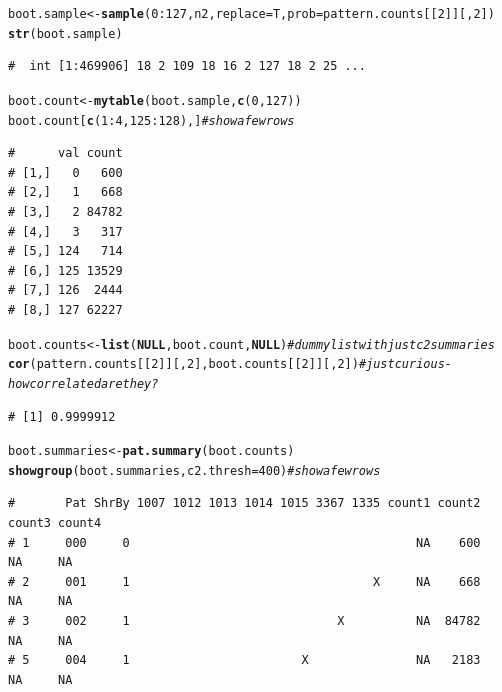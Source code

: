 \documentclass{article}\usepackage[]{graphicx}\usepackage[]{color}
\makeatletter
\newcommand{\hlnum}[1]{\textcolor[rgb]{0.686,0.059,0.569}{#1}}%
\newcommand{\hlcom}[1]{\textcolor[rgb]{0.678,0.584,0.686}{\textit{#1}}}%
\newcommand{\hlopt}[1]{\textcolor[rgb]{0,0,0}{#1}}%
\newcommand{\hlstd}[1]{\textcolor[rgb]{0.345,0.345,0.345}{#1}}%
\newcommand{\hlkwa}[1]{\textcolor[rgb]{0.161,0.373,0.58}{\textbf{#1}}}%
\newcommand{\hlkwb}[1]{\textcolor[rgb]{0.69,0.353,0.396}{#1}}%
\newcommand{\hlkwc}[1]{\textcolor[rgb]{0.333,0.667,0.333}{#1}}%
\newcommand{\hlkwd}[1]{\textcolor[rgb]{0.737,0.353,0.396}{\textbf{#1}}}%
\newenvironment{kframe}{%
 \def\at@end@of@kframe{}%
 \ifinner\ifhmode%
  \def\at@end@of@kframe{\end{minipage}}%
  \begin{minipage}{\columnwidth}%
 \fi\fi%
 \def\FrameCommand##1{\hskip\@totalleftmargin \hskip-\fboxsep
 \colorbox{shadecolor}{##1}\hskip-\fboxsep
     \hskip-\linewidth \hskip-\@totalleftmargin \hskip\columnwidth}%
 \MakeFramed {\advance\hsize-\width
   \@totalleftmargin\z@ \linewidth\hsize
   \@setminipage}}%
 {\par\unskip\endMakeFramed%
 \at@end@of@kframe}
\newenvironment{knitrout}{}{} %
\makeatother
\begin{document}
\begin{knitrout}\footnotesize
{}\color{fgcolor}\begin{kframe}
\begin{alltt}
\hlstd{boot.sample} \hlkwb{<-} \hlkwd{sample}\hlstd{(}\hlnum{0}\hlopt{:}\hlnum{127}\hlstd{,n2,}\hlkwc{replace}\hlstd{=T,}\hlkwc{prob}\hlstd{=pattern.counts[[}\hlnum{2}\hlstd{]][,}\hlnum{2}\hlstd{])}
\hlkwd{str}\hlstd{(boot.sample)}
\end{alltt}
\begin{verbatim}
#  int [1:469906] 18 2 109 18 16 2 127 18 2 25 ...
\end{verbatim}
\begin{alltt}
\hlstd{boot.count} \hlkwb{<-} \hlkwd{mytable}\hlstd{(boot.sample,}\hlkwd{c}\hlstd{(}\hlnum{0}\hlstd{,}\hlnum{127}\hlstd{))}
\hlstd{boot.count[}\hlkwd{c}\hlstd{(}\hlnum{1}\hlopt{:}\hlnum{4}\hlstd{,}\hlnum{125}\hlopt{:}\hlnum{128}\hlstd{),]} \hlcom{# show a few rows}
\end{alltt}
\begin{verbatim}
#      val count
# [1,]   0   600
# [2,]   1   668
# [3,]   2 84782
# [4,]   3   317
# [5,] 124   714
# [6,] 125 13529
# [7,] 126  2444
# [8,] 127 62227
\end{verbatim}
\begin{alltt}
\hlstd{boot.counts} \hlkwb{<-} \hlkwd{list}\hlstd{(}\hlkwa{NULL}\hlstd{,boot.count,}\hlkwa{NULL}\hlstd{)} \hlcom{# dummy list with just c2 summaries}
\hlkwd{cor}\hlstd{(pattern.counts[[}\hlnum{2}\hlstd{]][,}\hlnum{2}\hlstd{],boot.counts[[}\hlnum{2}\hlstd{]][,}\hlnum{2}\hlstd{])} \hlcom{# just curious - how correlated are they?}
\end{alltt}
\begin{verbatim}
# [1] 0.9999912
\end{verbatim}
\begin{alltt}
\hlstd{boot.summaries} \hlkwb{<-} \hlkwd{pat.summary}\hlstd{(boot.counts)}
\hlkwd{showgroup}\hlstd{(boot.summaries,}\hlkwc{c2.thresh}\hlstd{=}\hlnum{400}\hlstd{)} \hlcom{#show a few rows}
\end{alltt}
\begin{verbatim}
#       Pat ShrBy 1007 1012 1013 1014 1015 3367 1335 count1 count2 count3 count4
# 1     000     0                                        NA    600     NA     NA
# 2     001     1                                  X     NA    668     NA     NA
# 3     002     1                             X          NA  84782     NA     NA
# 5     004     1                        X               NA   2183     NA     NA

\end{verbatim}
\end{kframe}
\end{knitrout}
\end{document}
